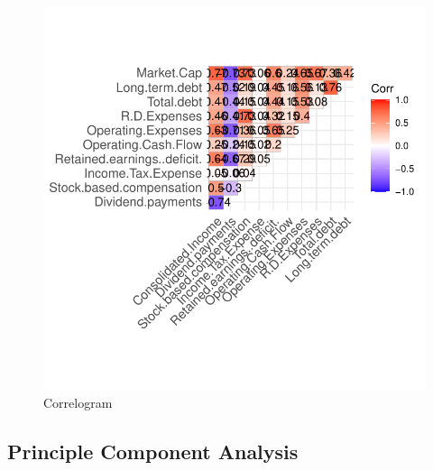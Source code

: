 \documentclass[11pt,]{article}
\begin{document}
\begin{figure}

{\centering \includegraphics{stock_analysis_files/figure-latex/corrplot 2-1} 

}

\caption{Correlogram\label{sec:fig3}}\label{fig:corrplot 2}
\end{figure}

\hypertarget{principle-component-analysis}{%
\subsection{Principle Component
Analysis}\label{principle-component-analysis}}
\end{document}
